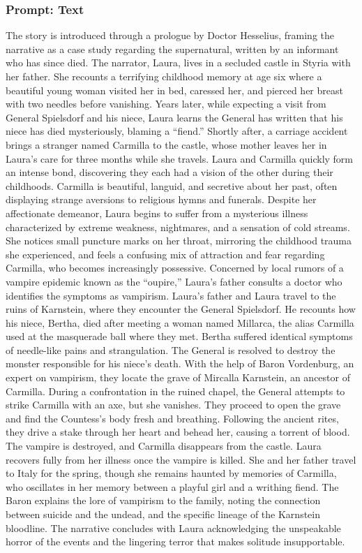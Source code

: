 \documentclass{article} %
\begin{document}
\subsubsection{Prompt: Text}

The story is introduced through a prologue by Doctor Hesselius, framing the narrative as a case study regarding the supernatural, written by an informant who has since died. The narrator, Laura, lives in a secluded castle in Styria with her father. She recounts a terrifying childhood memory at age six where a beautiful young woman visited her in bed, caressed her, and pierced her breast with two needles before vanishing. Years later, while expecting a visit from General Spielsdorf and his niece, Laura learns the General has written that his niece has died mysteriously, blaming a ``fiend.'' Shortly after, a carriage accident brings a stranger named Carmilla to the castle, whose mother leaves her in Laura's care for three months while she travels. Laura and Carmilla quickly form an intense bond, discovering they each had a vision of the other during their childhoods. Carmilla is beautiful, languid, and secretive about her past, often displaying strange aversions to religious hymns and funerals. Despite her affectionate demeanor, Laura begins to suffer from a mysterious illness characterized by extreme weakness, nightmares, and a sensation of cold streams. She notices small puncture marks on her throat, mirroring the childhood trauma she experienced, and feels a confusing mix of attraction and fear regarding Carmilla, who becomes increasingly possessive. Concerned by local rumors of a vampire epidemic known as the ``oupire,'' Laura's father consults a doctor who identifies the symptoms as vampirism. Laura's father and Laura travel to the ruins of Karnstein, where they encounter the General Spielsdorf. He recounts how his niece, Bertha, died after meeting a woman named Millarca, the alias Carmilla used at the masquerade ball where they met. \textcolor{skipred}{Bertha suffered identical symptoms of needle-like pains and strangulation.} The General is resolved to destroy the monster responsible for his niece's death. With the help of Baron Vordenburg, an expert on vampirism, they locate the grave of Mircalla Karnstein, an ancestor of Carmilla. During a confrontation in the ruined chapel, the General attempts to strike Carmilla with an axe, but she vanishes. They proceed to open the grave and find the Countess's body fresh and breathing. Following the ancient rites, they drive a stake through her heart and behead her, causing a torrent of blood. The vampire is destroyed, and Carmilla disappears from the castle. Laura recovers fully from her illness once the vampire is killed. She and her father travel to Italy for the spring, though she remains haunted by memories of Carmilla, who oscillates in her memory between a playful girl and a writhing fiend. The Baron explains the lore of vampirism to the family, noting the connection between suicide and the undead, and the specific lineage of the Karnstein bloodline. The narrative concludes with Laura acknowledging the unspeakable horror of the events and the lingering terror that makes solitude insupportable.
\end{document}
